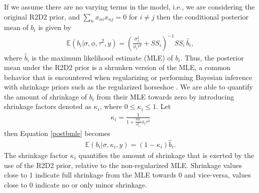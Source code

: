 If we assume there are no varying terms in the model, i.e., we are considering the original R2D2 prior, and $\sum_{n} x_{ni} x_{nj} = 0$ for $i\neq j$ then the conditional posterior mean of $b_i$ is given by
\begin{align}
    \label{postbmle}
    \mathbb{E}(b_i|  \sigma, \phi, \tau^2, y )= \left( \frac{\sigma^2_{x_i}}{\phi_i
    \tau^2}+ SS_i  \right)^{-1} SS_i \, \hat{b}_i,
\end{align}
where $\hat{b}_i$ is the maximum likelihood estimate (MLE) of $b_i$. Thus, the posterior mean under the R2D2 prior is a shrunken version of the MLE, a common behavior that is encountered when regularizing \citep{Ridge} or performing Bayesian inference with shrinkage priors such as the regularized horseshoe \citep{PiironenHorseshoe}. We are able to quantify the amount of shrinkage of $b_i$ from their MLE towards zero by introducing shrinkage factors denoted as $\kappa_i$, where $0 \leq \kappa_i \leq 1$. Let
\begin{align}
    \label{defkappa}
    \kappa_i= \frac{1}{1+\frac{SS_i}{\sigma_{x_i}^2} \phi_i\tau^2}
\end{align}
then Equation \eqref{postbmle} becomes
\begin{align}
    \label{postbmleshrinkage}
    \mathbb{E}(b_i| \sigma,\kappa_i, y )= (1-\kappa_i) \hat{b}_i.
\end{align}
The shrinkage factor $\kappa_i$ quantifies the amount of shrinkage that is exerted by the use of the R2D2 prior, relative to the non-regularized MLE. Shrinkage values close to 1 indicate full shrinkage from the MLE towards 0 and vice-versa, values close to 0 indicate no or only minor shrinkage.

